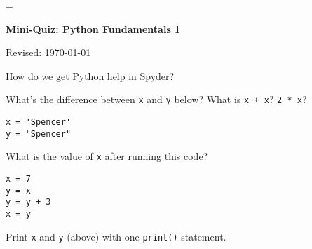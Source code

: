 \documentclass[11pt]{exam}
\begin{document}
\parskip=\bigskipamount
\parindent=0.0in
\thispagestyle{empty}


\bigskip\bigskip
\centerline{\Large \bf  Mini-Quiz:  Python Fundamentals 1}
\centerline{Revised: \today}


\bigskip
\begin{questions}
\item How do we get Python help in Spyder?
\vspace{0.9in}

\item What's the difference between {\tt x} and {\tt y} below?
What is {\tt x + x}?  {\tt 2 * x}?
\begin{verbatim}
x = 'Spencer'
y = "Spencer"
\end{verbatim}
\vspace{0.9in}

\item What is the value of {\tt x} after running this code?
\begin{verbatim}
x = 7
y = x
y = y + 3
x = y
\end{verbatim}
\vspace{0.9in}

\item  
Print {\tt x} and {\tt y} (above) with one {\tt print()} statement. 
\vspace{0.9in}


\end{questions}


\end{document}
